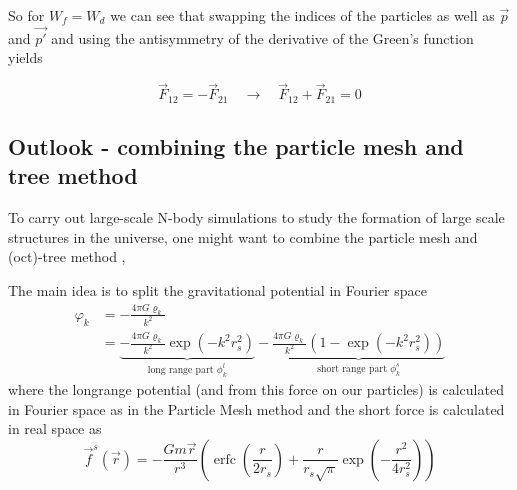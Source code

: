 So for $W_f = W_d$ we can see that swapping the indices of the particles as well as $\vec{p}$ and $\vec{p'}$ and using the antisymmetry of the derivative of the Green's function
yields

\begin{equation}
    \vec{F}_{12} = - \vec{F}_{21} \quad \rightarrow \quad \vec{F}_{12} + \vec{F}_{21} = 0
\end{equation}

\subsection{Outlook - combining the particle mesh and tree method}


To carry out large-scale N-body simulations
to study the formation of large scale structures
in the universe, one might want to combine the particle
mesh and (oct)-tree method \citep{Bagla02}, 

The main idea is to split the gravitational potential
in Fourier space
\begin{equation}
    \begin{aligned}
        \varphi_k & =-\frac{4 \pi G \varrho_k}{k^2} \\
        & =\underbrace{-\frac{4 \pi G \varrho_k}{k^2} \exp \left(-k^2 r_s^2\right)}_{\text{long range part } \phi_k^l}-\underbrace{\frac{4 \pi G \varrho_k}{k^2}\left(1-\exp \left(-k^2 r_s^2\right)\right)}_{\text{short range part } \phi_k^s}
    \end{aligned}
\end{equation}
where the longrange potential (and from this force on our particles) is calculated in Fourier space as
in the Particle Mesh method and the short force is calculated in
real space as
\begin{equation}
    \vec{f}^s(\vec{r})=-\frac{G m \vec{r}}{r^3}\left(\operatorname{erfc}\left(\frac{r}{2 r_s}\right)+\frac{r}{r_s \sqrt{\pi}} \exp \left(-\frac{r^2}{4 r_s^2}\right)\right)
\end{equation}

\pagebreak
